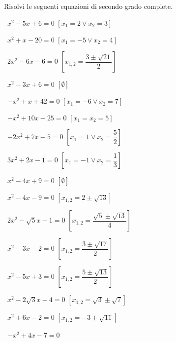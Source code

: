 \subsection*{}

\begin{esercizio}[*]
 \label{ese:3.12}
Risolvi le seguenti equazioni di secondo grado complete.
\begin{htmulticols}{2}
 \begin{enumeratea}
 \item~\(x^{2}-5 x + 6=0\)
  \hfill\(\left[x_{1} = 2 \vee x_{2} = 3\right]\)
 \item~\(x^{2} + x-20=0\)
  \hfill\(\left[x_{1} =-5 \vee x_{2} = 4\right]\)
 \item~\(2 x^{2}-6 x-6=0\)
  \hfill\(\left[x_{1,2} = \dfrac{3 \pm \sqrt{21}}{2}\right]\)
 \item~\(x^{2}-3 x + 6=0\)
  \hfill\(\left[\emptyset\right]\)
 \item~\(- x^{2} + x + 42=0\)
  \hfill\(\left[x_{1} =-6 \vee x_{2} = 7\right]\)
 \item~\(- x^{2} + 10 x-25=0\)
  \hfill\(\left[x_{1} = x_{2} = 5\right]\)
 \item~\(- 2 x^{2} + 7 x-5=0\)
  \hfill\(\left[x_{1} = 1 \vee x_{2} = \dfrac{5}{2}\right]\)
 \item~\(3 x^{2} + 2 x-1=0\)
  \hfill\(\left[x_{1} =-1 \vee x_{2} = \dfrac{1}{3}\right]\)
 \item~\(x^{2}-4 x + 9 = 0\)
  \hfill\(\left[\emptyset\right]\)
 \item~\(x^{2}-4 x-9 = 0\)
  \hfill\(\left[x_{1,2} = 2 \pm \sqrt{13}\right]\)
 \item~\(2 x^{2}-\sqrt{5} x-1 = 0\)
  \hfill\(\left[x_{1,2} = \dfrac{\sqrt{5} \pm \sqrt{13}}{4}\right]\)
 \item~\(x^{2}-3 x-2=0\)
  \hfill\(\left[x_{1,2} = \dfrac{3 \pm \sqrt{17}}{2}\right]\)
 \item~\(x^{2}-5 x + 3 = 0\)
  \hfill\(\left[x_{1,2} = \dfrac{5 \pm \sqrt{13}}{2}\right]\)
 \item~\(x^{2}-2 \sqrt{3} x-4=0\)
  \hfill\(\left[x_{1,2} = \sqrt{3} \pm \sqrt{7}\right]\)
 \item~\(x^{2} + 6 x-2 = 0\)
  \hfill\(\left[x_{1,2} =-3 \pm \sqrt{11}\right]\)
 \item~\(- x^{2} + 4 x-7=0\)

\end{enumeratea}
\end{htmulticols}
\end{esercizio}
